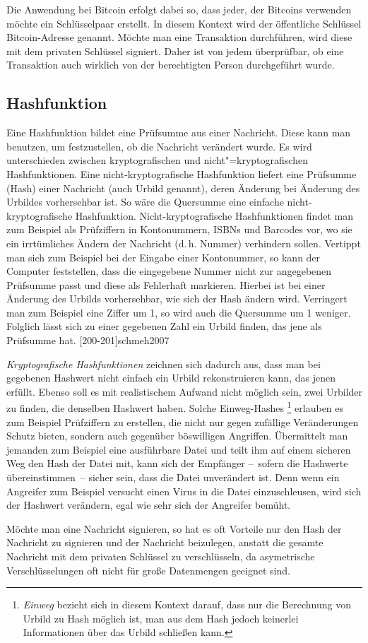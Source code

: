 Die Anwendung bei Bitcoin erfolgt dabei so, dass jeder, der Bitcoins verwenden möchte ein Schlüsselpaar erstellt.
In diesem Kontext wird der öffentliche Schlüssel Bitcoin-Adresse genannt.
Möchte man eine Transaktion durchführen, wird diese mit dem privaten Schlüssel signiert.
Daher ist von jedem überprüfbar, ob eine Transaktion auch wirklich von der berechtigten Person durchgeführt wurde.

\subsection{Hashfunktion}

Eine Hashfunktion bildet eine Prüfsumme aus einer Nachricht.
Diese kann man benutzen, um festzustellen, ob die Nachricht verändert wurde.
Es wird unterschieden zwischen kryptografischen und nicht"=kryptografischen Hashfunktionen.
Eine nicht-kryptografische Hashfunktion liefert eine Prüfsumme (Hash) einer Nachricht (auch Urbild genannt), deren Änderung bei Änderung des Urbildes vorhersehbar ist.
So wäre die Quersumme eine einfache nicht-kryptografische Hashfunktion.
Nicht-kryptografische Hashfunktionen findet man zum Beispiel als Prüfziffern in Kontonummern, ISBNs und Barcodes vor, wo sie ein irrtümliches Ändern der Nachricht (d.\,h. Nummer) verhindern sollen.
Vertippt man sich zum Beispiel bei der Eingabe einer Kontonummer, so kann der Computer feststellen, dass die eingegebene Nummer nicht zur angegebenen Prüfsumme passt und diese als Fehlerhaft markieren.
Hierbei ist bei einer Änderung des Urbilds vorhersehbar, wie sich der Hash ändern wird.
Verringert man zum Beispiel eine Ziffer um 1, so wird auch die Quersumme um 1 weniger.
Folglich lässt sich zu einer gegebenen Zahl ein Urbild finden, das jene als Prüfsumme hat.
[200-201]{schmeh2007}

\emph{Kryptografische Hashfunktionen} zeichnen sich dadurch aus, dass man bei gegebenen Hashwert nicht einfach ein Urbild rekonstruieren kann, das jenen erfüllt.
Ebenso soll es mit realistischem Aufwand nicht möglich sein, zwei Urbilder zu finden, die denselben Hashwert haben.
Solche Einweg-Hashes%
\footnote{\emph{Einweg} bezieht sich in diesem Kontext darauf, dass nur die Berechnung von Urbild zu Hash möglich ist, man aus dem Hash jedoch keinerlei Informationen über das Urbild schließen kann.}
erlauben es zum Beispiel Prüfziffern zu erstellen, die nicht nur gegen zufällige Veränderungen Schutz bieten, sondern auch gegenüber böswilligen Angriffen.
Übermittelt man jemanden zum Beispiel eine ausführbare Datei und teilt ihm auf einem sicheren Weg den Hash der Datei mit, kann sich der Empfänger --~sofern die Hashwerte übereinstimmen~-- sicher sein, dass die Datei unverändert ist.
Denn wenn ein Angreifer zum Beispiel versucht einen Virus in die Datei einzuschleusen, wird sich der Hashwert verändern, egal wie sehr sich der Angreifer bemüht.

Möchte man eine Nachricht signieren, so hat es oft Vorteile nur den Hash der Nachricht zu signieren und der Nachricht beizulegen, anstatt die gesamte Nachricht mit dem privaten Schlüssel zu verschlüsseln, da asymetrische Verschlüsselungen oft nicht für große Datenmengen geeignet sind.
